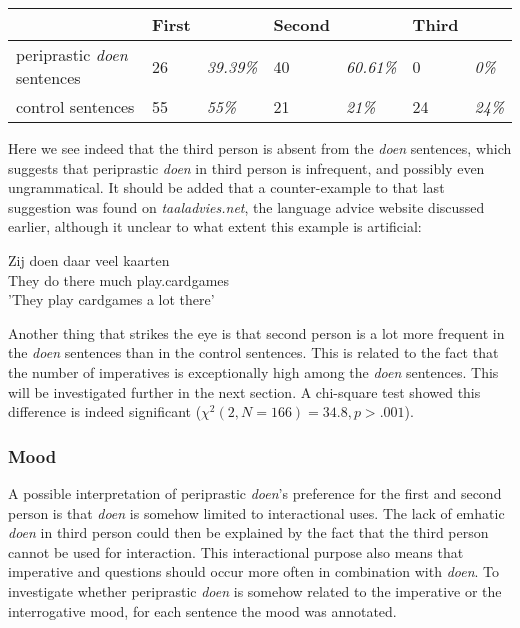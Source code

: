\documentclass[12pt]{article}
\begin{document}
\begin{table}[h]
\begin{tabular}{|l|ll|ll|ll|}
\hline
&First&&Second&&Third&\\
\hline
periprastic \emph{doen} sentences	&26 	& \emph{39.39\%}	&40		&\emph{60.61\%} 	& 0 &\emph{0\%}\\
control sentences					&55		& \emph{55\%}		&21	 	&\emph{21\%} 		& 24 &\emph{24\%}\\
\hline
\end{tabular}
\end{table}

Here we see indeed that the third person is absent from the \emph{doen} sentences, which suggests that periprastic \emph{doen} in third person is infrequent, and possibly even ungrammatical. It should be added that a counter-example to that last suggestion was found on \emph{taaladvies.net}, the language advice website discussed earlier, although it unclear to what extent this example is artificial:

\begin{exe}
\ex \gll Zij doen daar veel kaarten\\
They do there much play.cardgames\\
'They play cardgames a lot there'
\end{exe}

Another thing that strikes the eye is that second person is a lot more frequent in the \emph{doen} sentences than in the control sentences. This is related to the fact that the number of imperatives is exceptionally high among the \emph{doen} sentences. This will be investigated further in the next section. A chi-square test showed this difference is indeed significant ($\chi^2(2, N=166) = 34.8, p > .001$).

\subsubsection{Mood}

A possible interpretation of periprastic \emph{doen}'s preference for the first and second person is that \emph{doen} is somehow limited to interactional uses. The lack of emhatic \emph{doen} in third person could then be explained by the fact that the third person cannot be used for interaction. This interactional purpose also means that imperative and questions should occur more often in combination with \emph{doen}. To investigate whether periprastic \emph{doen} is somehow related to the imperative or the interrogative mood, for each sentence the mood was annotated.
\end{document}
